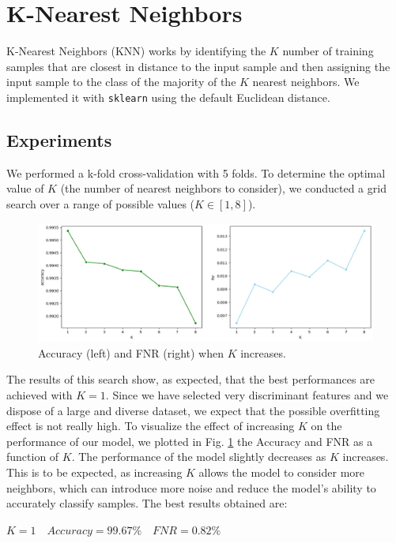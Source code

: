 \documentclass[twocolumn, switch]{article} %
\newcommand\x{0.7}
\begin{document}
\section{K-Nearest Neighbors}
\label{sec:knn}
K-Nearest Neighbors (KNN) works by identifying the $K$ number of training samples that are closest in distance to the input sample and then assigning the input sample to the class of the majority of the $K$ nearest neighbors. We implemented it with \texttt{sklearn} \cite{scikit-learn} using the default Euclidean distance.
\subsection{Experiments}
We performed a k-fold cross-validation with 5 folds.
To determine the optimal value of $K$ (the number of nearest neighbors to consider), we conducted a grid search over a range of possible values ($K \in [1, 8]$).
\begin{figure}[ht!]
	\centering
	\includegraphics[width=\x\linewidth]{knn_accuracy_fnr.png}
	\caption{Accuracy (left) and FNR (right) when $K$ increases.}
	\label{fig:knntrain}
	\vspace{-10pt}
\end{figure}
The results of this search show, as expected, that the best performances are achieved with $K=1$. Since we have selected very discriminant features and we dispose of a large and diverse dataset, we expect that the possible overfitting effect is not really high.
To visualize the effect of increasing $K$ on the performance of our model, we plotted in Fig. \ref{fig:knntrain} the Accuracy and FNR as a function of $K$. The performance of the model slightly decreases as $K$ increases. This is to be expected, as increasing $K$ allows the model to consider more neighbors, which can introduce more noise and reduce the model's ability to accurately classify samples. The best results obtained are:
\begin{center}
	$K=1 \quad Accuracy=99.67\% \quad FNR=0.82\%$
\end{center}
\end{document}
